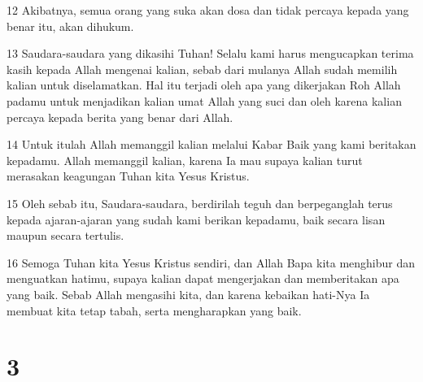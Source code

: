 \par 12 Akibatnya, semua orang yang suka akan dosa dan tidak percaya kepada yang benar itu, akan dihukum.
\par 13 Saudara-saudara yang dikasihi Tuhan! Selalu kami harus mengucapkan terima kasih kepada Allah mengenai kalian, sebab dari mulanya Allah sudah memilih kalian untuk diselamatkan. Hal itu terjadi oleh apa yang dikerjakan Roh Allah padamu untuk menjadikan kalian umat Allah yang suci dan oleh karena kalian percaya kepada berita yang benar dari Allah.
\par 14 Untuk itulah Allah memanggil kalian melalui Kabar Baik yang kami beritakan kepadamu. Allah memanggil kalian, karena Ia mau supaya kalian turut merasakan keagungan Tuhan kita Yesus Kristus.
\par 15 Oleh sebab itu, Saudara-saudara, berdirilah teguh dan berpeganglah terus kepada ajaran-ajaran yang sudah kami berikan kepadamu, baik secara lisan maupun secara tertulis.
\par 16 Semoga Tuhan kita Yesus Kristus sendiri, dan Allah Bapa kita menghibur dan menguatkan hatimu, supaya kalian dapat mengerjakan dan memberitakan apa yang baik. Sebab Allah mengasihi kita, dan karena kebaikan hati-Nya Ia membuat kita tetap tabah, serta mengharapkan yang baik.

\chapter{3}

